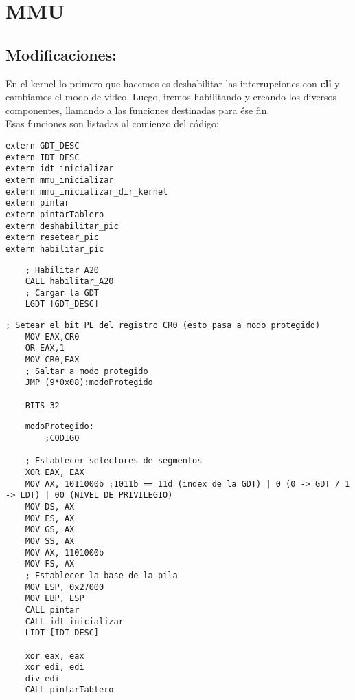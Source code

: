 
\section{MMU}
\subsection{Modificaciones:}

En el kernel lo primero que hacemos es deshabilitar las interrupciones con \textbf{cli} y cambiamos el modo de video. 
Luego, iremos habilitando y creando los diversos componentes, llamando a las funciones destinadas para \'ese fin.
\\
Esas funciones son listadas al comienzo del c\'odigo:

\begin{codesnippet}
\begin{verbatim}
extern GDT_DESC
extern IDT_DESC 
extern idt_inicializar
extern mmu_inicializar
extern mmu_inicializar_dir_kernel
extern pintar
extern pintarTablero
extern deshabilitar_pic
extern resetear_pic
extern habilitar_pic
\end{verbatim}
\end{codesnippet}

\begin{codesnippet}
\begin{verbatim}
    ; Habilitar A20
    CALL habilitar_A20
    ; Cargar la GDT
    LGDT [GDT_DESC]
\end{verbatim}
\end{codesnippet}

\begin{codesnippet}
\begin{verbatim}
; Setear el bit PE del registro CR0 (esto pasa a modo protegido)
    MOV EAX,CR0
    OR EAX,1
    MOV CR0,EAX
    ; Saltar a modo protegido
    JMP (9*0x08):modoProtegido

    BITS 32
\end{verbatim}
\end{codesnippet}

\begin{codesnippet}
\begin{verbatim}
    modoProtegido:
        ;CODIGO
        
    ; Establecer selectores de segmentos
    XOR EAX, EAX
    MOV AX, 1011000b ;1011b == 11d (index de la GDT) | 0 (0 -> GDT / 1 -> LDT) | 00 (NIVEL DE PRIVILEGIO)
    MOV DS, AX
    MOV ES, AX
    MOV GS, AX
    MOV SS, AX
    MOV AX, 1101000b
    MOV FS, AX
    ; Establecer la base de la pila
    MOV ESP, 0x27000
    MOV EBP, ESP
    CALL pintar
    CALL idt_inicializar
	LIDT [IDT_DESC]

    xor eax, eax
    xor edi, edi
    div edi	
	CALL pintarTablero
\end{verbatim}
\end{codesnippet}

